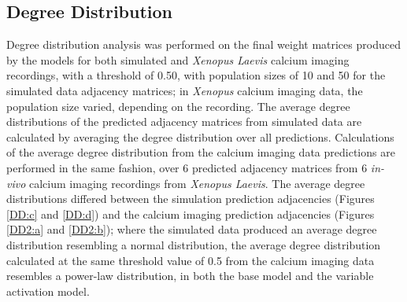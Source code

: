 \documentclass[11pt,titlepage]{article}
\begin{document}
\subsection{Degree Distribution}
Degree distribution analysis was performed on the final weight matrices produced by the models for both simulated and \textit{Xenopus Laevis} calcium imaging recordings, with a threshold of 0.50, with population sizes of 10 and 50 for the simulated data adjacency matrices; in \textit{Xenopus} calcium imaging data, the population size varied, depending on the recording. The average degree distributions of the predicted adjacency matrices from simulated data are calculated by averaging the degree distribution over all predictions. Calculations of the average degree distribution from the calcium imaging data predictions are performed in the same fashion, over 6 predicted adjacency matrices from 6 \textit{in-vivo} calcium imaging recordings from \textit{Xenopus Laevis}. The average degree distributions differed between the simulation prediction adjacencies (Figures \ref{DD:c} and \ref{DD:d}) and the calcium imaging prediction adjacencies (Figures \ref{DD2:a} and \ref{DD2:b}); where the simulated data produced an average degree distribution resembling a normal distribution, the average degree distribution calculated at the same threshold value of 0.5 from the calcium imaging data resembles a power-law distribution, in both the base model and the variable activation model.
\end{document}

